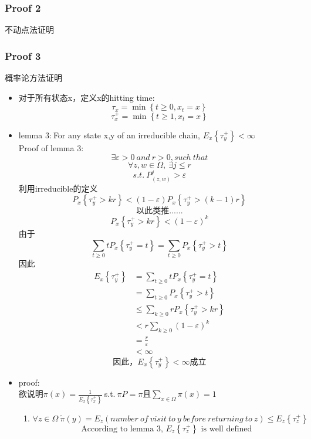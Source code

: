 \documentclass[a4paper, 11pt]{article} %
\begin{document}
\begin{small}
\subsubsection{Proof 2}
不动点法证明

\subsubsection{Proof 3}
概率论方法证明
\begin{itemize}
	\item 对于所有状态x，定义x的hitting time:
	$$
	  \tau_x=\min\left\{t\geq0, x_t=x\right\}
	$$
	$$
	  \tau_x^{+}=\min\left\{t\geq1, x_t=x\right\}
	$$
	\item lemma 3:$\  $For any state x,y of an irreducible chain, $E_x\left\{\tau_y^{+}\right\}<\infty$\\
	Proof of lemma 3:
	$$\exists \varepsilon > 0\ and\ r>0,such\ that$$
	$$\forall z,w \in \Omega,\ \exists j\leq r$$
	$$
	 s.t.\ P_{(z,w)}^j>\varepsilon
	$$ 
	利用irreducible的定义\\
	$$
	P_x\left\{\tau_y^{+}>kr\right\}<(1-\varepsilon)P_x\left\{\tau_y^{+}>(k-1)r\right\}
	$$
	$$
	\mbox{以此类推......}
	$$
	$$
	 P_x\left\{\tau_y^{+}>kr\right\}<(1-\varepsilon)^k
	$$
     由于
     $$
     \sum _{t\geq 0}tP_x\left\{\tau_y^{+}=t\right\}=\sum _{t\geq 0}P_x\left\{\tau_y^{+}>t\right\}
     $$
     因此
     \begin{align*}
     E_x\left\{\tau_y^{+}\right\}&=\sum _{t\geq 0}tP_x\left\{\tau_y^{+}=t\right\}\\
     &=\sum _{t\geq 0}P_x\left\{\tau_y^{+}>t\right\}\\
     &\leq \sum _{k\geq 0}rP_x\left\{\tau_y^{+}>kr\right\}\\
     &<r\sum _{k\geq 0}(1-\varepsilon)^k\\
     &=\frac{r}{\varepsilon}\\
     &<\infty
     \end{align*}
     $$
     \mbox{因此，}E_x\left\{\tau_y^{+}\right\}<\infty \mbox{成立}
     $$
	\item proof:\\
	欲说明$\pi(x)=\frac{1}{E_x\left\{\tau_x^{+}\right\}}\ $s.t.$\ \pi P=\pi$且$\sum _{x\in \Omega}\pi(x)=1$
	\begin{enumerate}
		\item
    $$
    \forall z \in \Omega\  \widetilde{\pi}(y)=E_z(number\ of\ visit\ to\ y\ before\ returning\ to\ z)\leq E_z\left\{\tau_z^{+}\right\}
    $$
    $$
    \mbox{According to lemma 3, $E_z\left\{\tau_z^{+}\right\}$ is well defined}
$$
\end{enumerate}
\end{itemize}
\end{small}
\end{document}
